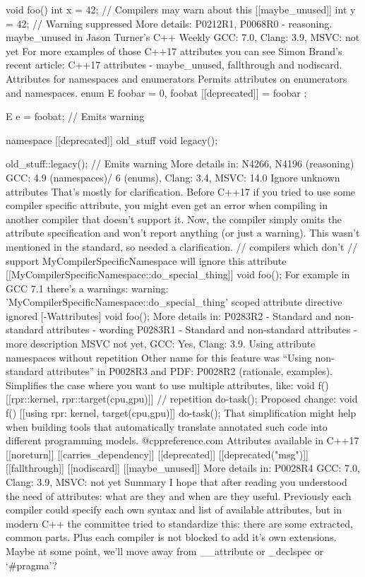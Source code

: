 void foo() {
   int x = 42; // Compilers may warn about this
   [[maybe_unused]] int y = 42; // Warning suppressed
}
More details:
P0212R1, 
P0068R0 - reasoning.
maybe_unused in Jason Turner’s C++ Weekly
GCC: 7.0, Clang: 3.9, MSVC: not yet
For more examples of those C++17 attributes you can see Simon Brand's recent article: C++17 attributes - maybe_unused, fallthrough and nodiscard.
Attributes for namespaces and enumerators
Permits attributes on enumerators and namespaces.
enum E {
  foobar = 0,
  foobat [[deprecated]] = foobar
};

E e = foobat; // Emits warning

namespace [[deprecated]] old_stuff{
    void legacy();
}

old_stuff::legacy(); // Emits warning
More details in: 
N4266, 
N4196 (reasoning)
GCC: 4.9 (namespaces)/ 6 (enums), Clang: 3.4, MSVC: 14.0
Ignore unknown attributes
That's mostly for clarification. 
Before C++17 if you tried to use some compiler specific attribute, you might even get an error when compiling in another compiler that doesn’t support it. Now, the compiler simply omits the attribute specification and won’t report anything (or just a warning). This wasn't mentioned in the standard, so needed a clarification.
// compilers which don't 
// support MyCompilerSpecificNamespace will ignore this attribute
[[MyCompilerSpecificNamespace::do_special_thing]] 
void foo();
For example in GCC 7.1 there’s a warnings:
warning: 'MyCompilerSpecificNamespace::do_special_thing'
scoped attribute directive ignored [-Wattributes]
void foo(); 
More details in:
P0283R2 - Standard and non-standard attributes - wording
P0283R1 - Standard and non-standard attributes - more description
MSVC not yet, GCC: Yes, Clang: 3.9.
Using attribute namespaces without repetition
Other name for this feature was “Using non-standard attributes” in P0028R3 and PDF: P0028R2 (rationale, examples).
Simplifies the case where you want to use multiple attributes, like:
void f() {
    [[rpr::kernel, rpr::target(cpu,gpu)]] // repetition
    do-task();
}
Proposed change:
void f() {
    [[using rpr: kernel, target(cpu,gpu)]]
    do-task();
}
That simplification might help when building tools that automatically translate annotated such code into different programming models.
@cppreference.com 
Attributes available in C++17
[[noreturn]]
[[carries_dependency]]
[[deprecated]]
[[deprecated("msg")]]
[[fallthrough]]
[[nodiscard]]
[[maybe_unused]]
More details in: P0028R4 
GCC: 7.0, Clang: 3.9, MSVC: not yet
Summary
I hope that after reading you understood the need of attributes: what are they and when are they useful. Previously each compiler could specify each own syntax and list of available attributes, but in modern C++ the committee tried to standardize this: there are some extracted, common parts. Plus each compiler is not blocked to add it’s own extensions. Maybe at some point, we’ll move away from __attribute or _declspec or `#pragma’?
